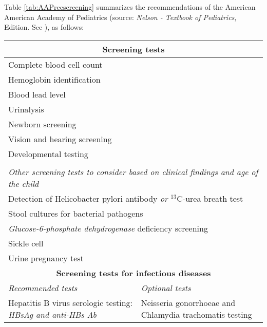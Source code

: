 Table \ref{tab:AAPrecscreening} summarizes the recommendations of the American American Academy of Pediatrics (source: \textit{Nelson - Textbook of Pediatrics},  Edition. See \cite{nelson}), as follows:

\newlength\mylength
\setlength\mylength{\dimexpr\textwidth-5\arrayrulewidth-8\tabcolsep}

\vspace{0.5cm}
\begin{footnotesize}
    \centering
	\begin{longtable}{p{0.5\mylength} p{0.5\mylength}}
	   	 \hline
	      \multicolumn{2}{c}{\small{\textbf{Screening tests}}}\\
	      \hline
	      \multicolumn{2}{l}{Complete blood cell count}\\
	      \multicolumn{2}{l}{Hemoglobin identification}\\
	      \multicolumn{2}{l}{Blood lead level}\\
	      \multicolumn{2}{l}{Urinalysis}\\
	      \multicolumn{2}{l}{Newborn screening\footnotemark[2]}\\
	      \multicolumn{2}{l}{Vision and hearing screening}\\
	      \multicolumn{2}{l}{Developmental testing}\\\\
	      \multicolumn{2}{l}{\textit{Other screening tests to consider based on clinical findings and age of the child}}\\
	      \multicolumn{2}{l}{Detection of Helicobacter pylori antibody \textit{or} $^{13}$C-urea breath test}\\
	      \multicolumn{2}{l}{Stool cultures for bacterial pathogens}\\
	      \multicolumn{2}{l}{\textit{Glucose-6-phosphate dehydrogenase} deficiency screening}\\
	      \multicolumn{2}{l}{Sickle cell}\\
	      \multicolumn{2}{l}{Urine pregnancy test}\\
	      \hline
	      \multicolumn{2}{c}{\small{\textbf{Screening tests for infectious diseases}}}\\
	      \hline
	      \textit{Recommended tests} & \textit{Optional tests}\\
	      Hepatitis B virus serologic testing: \textit{HBsAg and anti-HBs Ab}\footnotemark[3] & Neisseria gonorrhoeae and Chlamydia trachomatis testing\\

\end{longtable}
\end{footnotesize}
